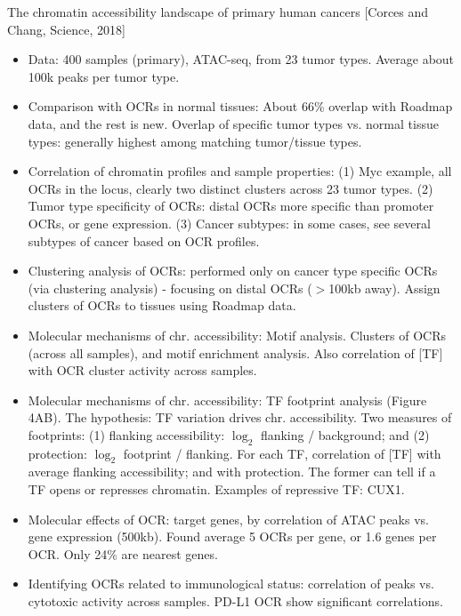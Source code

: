 \documentclass{report}
\begin{document}
The chromatin accessibility landscape of primary human cancers [Corces and Chang, Science, 2018]
\begin{itemize}
	\item Data: 400 samples (primary), ATAC-seq, from 23 tumor types. Average about 100k peaks per tumor type.
	
	\item Comparison with OCRs in normal tissues: About 66\% overlap with Roadmap data, and the rest is new. Overlap of specific tumor types vs. normal tissue types: generally highest among matching tumor/tissue types.
	
	\item Correlation of chromatin profiles and sample properties: (1) Myc example, all OCRs in the locus, clearly two distinct clusters across 23 tumor types. (2) Tumor type specificity of OCRs: distal OCRs more specific than promoter OCRs, or gene expression. (3) Cancer subtypes: in some cases, see several subtypes of cancer based on OCR profiles.

	\item Clustering analysis of OCRs: performed only on cancer type specific OCRs (via clustering analysis) - focusing on distal OCRs ($>$100kb away). Assign clusters of OCRs to tissues using Roadmap data.
		
	\item Molecular mechanisms of chr. accessibility: Motif analysis. Clusters of OCRs (across all samples), and motif enrichment analysis. Also correlation of [TF] with OCR cluster activity across samples.
	
	\item Molecular mechanisms of chr. accessibility: TF footprint analysis (Figure 4AB). The hypothesis: TF variation drives chr. accessibility. Two measures of footprints: (1) flanking accessibility: $\log_2$ flanking / background; and (2) protection: $\log_2$ footprint / flanking. For each TF, correlation of [TF] with average flanking accessibility; and with protection. The former can tell if a TF opens or represses chromatin. Examples of repressive TF: CUX1.
	
	\item Molecular effects of OCR: target genes, by correlation of ATAC peaks vs. gene expression (500kb). Found average 5 OCRs per gene, or 1.6 genes per OCR. Only 24\% are nearest genes.
	
	\item Identifying OCRs related to immunological status: correlation of peaks vs. cytotoxic activity across samples. PD-L1 OCR show significant correlations.
	

\end{itemize}
\end{document}
